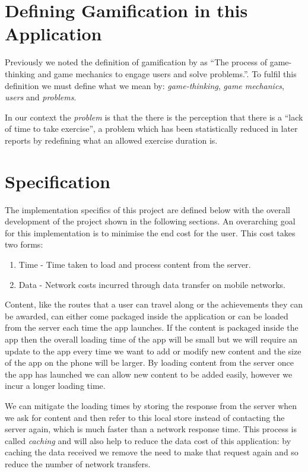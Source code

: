 \section{Defining Gamification in this Application}

Previously we noted the definition of gamification by
\citet{gamification_book} as ``The process of
game-thinking and game mechanics to engage users and solve
problems.''. To fulfil this definition we must define what we mean
by: \emph{game-thinking}, \emph{game mechanics}, \emph{users} and
\emph{problems}. 

In our context the \emph{problem} is that the there is the perception
that there is a ``lack of time to take exercise''\cite{exercise}, a
problem which has been statistically reduced in later reports by
redefining what an allowed exercise duration is\cite{exercise_2012}.

\section{Specification}
\label{sec:specification}
The implementation specifics of this project are defined below with
the overall development of the project shown in the following sections.
An overarching goal for this implementation is to minimise the end cost
for the user. This cost takes two forms: 
\begin{enumerate}
\item Time - Time taken to load and process content from the server.
\item Data - Network costs incurred through data transfer on mobile networks.
\end{enumerate}

Content, like the routes that a user can travel along or the
achievements they can be awarded, can either come packaged inside the
application or can be loaded from the server each time the app
launches. If the content is packaged inside the app then the overall
loading time of the app will be small but we will require an update to
the app every time we want to add or modify new content and the size
of the app on the phone will be larger. By loading content from the
server once the app has launched we can allow new content to be added
easily, however we incur a longer loading time.

We can mitigate the loading times by storing the response from the
server when we ask for content and then refer to this local store
instead of contacting the server again, which is much faster than a
network response time. This process is called \emph{caching} and will
also help to reduce the data cost of this application: by caching the
data received we remove the need to make that request again and so
reduce the number of network transfers.

